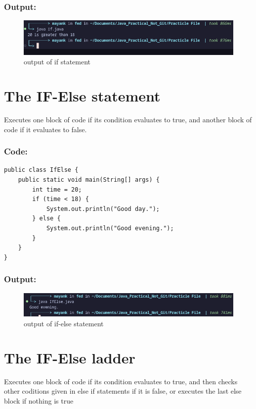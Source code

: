 \documentclass[a4paper,12pt]{article}
\begin{document}
\subsubsection{Output: }
\begin{figure}[H]
    \centering
    \includegraphics[width=0.9\linewidth]{images/output4.png}
    \caption{output of if statement}
    \label{fig:sample_image}
\end{figure}

\section{The IF-Else statement}
Executes one block of code if its condition evaluates to true, and another block of code if it evaluates to false.
\subsubsection{Code: }
\begin{lstlisting}
public class IfElse {
    public static void main(String[] args) {
        int time = 20;
        if (time < 18) {
            System.out.println("Good day.");
        } else {
            System.out.println("Good evening.");
        }
    }
}    
\end{lstlisting}
\subsubsection{Output: }
\begin{figure}[H]
    \centering
    \includegraphics[width=0.9\linewidth]{images/output5.png}
    \caption{output of if-else statement}
    \label{fig:sample_image}
\end{figure}

\section{The IF-Else ladder}
Executes one block of code if its condition evaluates to true, and then checks other
coditions given in else if statements if it is false, or executes the last else block if nothing
is true
\end{document}
